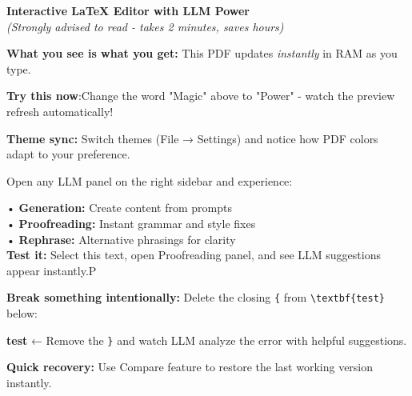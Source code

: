 \documentclass[12pt,a4paper]{article}
\begin{document}
\begin{tcolorbox}[colback=green!8!white,colframe=green!50!black,title=\Huge Noctern Quick Tour,sharp corners]
\begin{center}
\Large \textbf{Interactive LaTeX Editor with LLM Power} \\
\vspace{0.3cm}
\normalsize \textit{(Strongly advised to read - takes 2 minutes, saves hours)}
\end{center}
\end{tcolorbox}


\vspace{0.8cm}

\begin{tcolorbox}[colback=blue!5!white,colframe=blue!40!black,title=\textbf{Live Preview Magic},left=5mm,right=5mm]
\textbf{What you see is what you get:} This PDF updates \textit{instantly} in RAM as you type.

\textbf{Try this now}:Change the word "Magic" above to "Power" - watch the preview refresh automatically!

\textbf{Theme sync:} Switch themes (File → Settings) and notice how PDF colors adapt to your preference.
\end{tcolorbox}

\vspace{0.5cm}

\begin{tcolorbox}[colback=orange!8!white,colframe=orange!50!black,title=\textbf{LLM Assistant Sidebar},left=5mm,right=5mm]
Open any LLM panel on the right sidebar and experience:

• \textbf{Generation:} Create content from prompts \\
• \textbf{Proofreading:} Instant grammar and style fixes \\
• \textbf{Rephrase:} Alternative phrasings for clarity \\

\textbf{Test it:} Select this text, open Proofreading panel, and see LLM suggestions appear instantly.P
\end{tcolorbox}

\vspace{0.5cm}

\begin{tcolorbox}[colback=red!8!white,colframe=red!40!black,title=\textbf{Smart Error Detection},left=5mm,right=5mm]
\textbf{Break something intentionally:} Delete the closing \verb|{| from \verb|\textbf{test}| below:

\textbf{test} ← Remove the \verb|}| and watch LLM analyze the error with helpful suggestions.

\textbf{Quick recovery:} Use Compare feature to restore the last working version instantly.
\end{tcolorbox}
\end{document}
